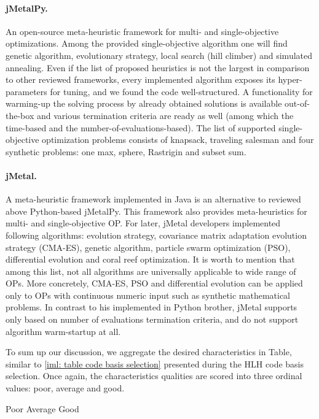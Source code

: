 \paragraph{jMetalPy.} An open-source meta-heuristic framework for multi- and single-objective optimizations. Among the provided single-objective algorithm one will find genetic algorithm, evolutionary strategy, local search (hill climber) and simulated annealing. Even if the list of proposed heuristics is not the largest in comparison to other reviewed frameworks, every implemented algorithm exposes its hyper-parameters for tuning, and we found the code well-structured. A functionality for warming-up the solving process by already obtained solutions is available out-of-the-box and various termination criteria are ready as well (among which the time-based and the number-of-evaluations-based). The list of supported single-objective optimization problems consists of knapsack, traveling salesman and four synthetic problems: one max, sphere, Rastrigin and subset sum.

\paragraph{jMetal.} A meta-heuristic framework implemented in Java is an alternative to reviewed above Python-based jMetalPy. This framework also provides meta-heuristics for multi- and single-objective OP. For later, jMetal developers implemented following algorithms: evolution strategy, covariance matrix adaptation evolution strategy (CMA-ES), genetic algorithm, particle swarm optimization (PSO), differential evolution and coral reef optimization. It is worth to mention that among this list, not all algorithms are universally applicable to wide range of OPs. More concretely, CMA-ES, PSO and differential evolution can be applied only to OPs with continuous numeric input such as synthetic mathematical problems. In contrast to his implemented in Python brother, jMetal supports only based on number of evaluations termination criteria, and do not support algorithm warm-startup at all.

To sum up our discussion, we aggregate the desired characteristics in Table, similar to \cref{iml: table code basis selection} presented during the HLH code basis selection. Once again, the characteristics qualities are scored into three ordinal values: poor, average and good.

Poor
Average
Good

